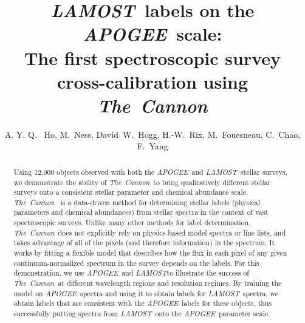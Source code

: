 \documentclass[12pt, preprint]{aastex}
\newcommand{\tc}{\textsl{The~Cannon}}
\newcommand{\apogee}{\textsl{APOGEE}}
\newcommand{\lamost}{\textsl{LAMOST}}
\begin{document}
\title{\lamost\ labels on the \apogee\ scale: \\ The first spectroscopic survey cross-calibration using \tc}
\author{A. Y. Q. ~Ho,
M.~Ness,
David~W.~Hogg, 
H.-W.~Rix,
M.~Fouesneau,
C.~Chao,
F.~Yang
}


\begin{abstract}

Using 12,000 objects observed with both the \apogee\ and \lamost\ stellar
surveys, we demonstrate the ability of \tc\ to bring qualitatively 
different stellar surveys onto a consistent stellar parameter and chemical 
abundance scale. 
\tc\ \citep{ness2015} is a data-driven method for determining stellar labels 
(physical parameters and chemical abundances) from stellar spectra in the 
context of vast spectroscopic surveys. 
Unlike many other methods for label determination, \tc\ does not 
explicitly rely on physics-based model spectra or line lists, and takes 
advantage of all of the pixels (and therefore information) in the spectrum. 
It works by fitting a flexible model that describes how the flux in each 
pixel of any given continuum-normalized spectrum in the survey depends on 
the labels. 
For this demonstration, we use \apogee\ and \lamost to illustrate the 
success of \tc\ at different wavelength regions and resolution regimes. 
By training the model on \apogee\ spectra and using it to obtain labels for 
\lamost\ spectra, we obtain labels that are consistent
with the \apogee\ labels for these objects, thus successfully putting spectra
from \lamost\ onto the \apogee\ parameter scale. 

\end{abstract}

\end{document}
